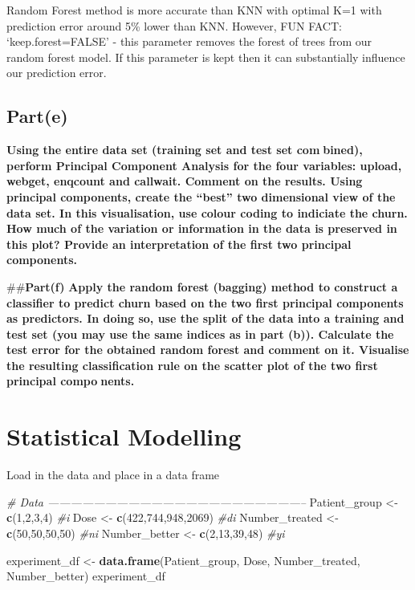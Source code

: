 \documentclass[
]{article}
\newenvironment{Shaded}{\begin{snugshade}}{\end{snugshade}}
\newcommand{\CommentTok}[1]{\textcolor[rgb]{0.56,0.35,0.01}{\textit{#1}}}
\newcommand{\DecValTok}[1]{\textcolor[rgb]{0.00,0.00,0.81}{#1}}
\newcommand{\KeywordTok}[1]{\textcolor[rgb]{0.13,0.29,0.53}{\textbf{#1}}}
\newcommand{\NormalTok}[1]{#1}
\newcommand{\StringTok}[1]{\textcolor[rgb]{0.31,0.60,0.02}{#1}}
\begin{document}
Random Forest method is more accurate than KNN with optimal K=1 with
prediction error around 5\% lower than KNN. However, FUN FACT:
`keep.forest=FALSE' - this parameter removes the forest of trees from
our random forest model. If this parameter is kept then it can
substantially influence our prediction error.

\hypertarget{parte}{%
\subsection{\texorpdfstring{\textbf{Part(e)}}{Part(e)}}\label{parte}}

\textbf{Using the entire data set (training set and test set combined),
perform Principal Component Analysis for the four variables: upload,
webget, enqcount and callwait. Comment on the results. Using principal
components, create the ``best'' two dimensional view of the data set. In
this visualisation, use colour coding to indiciate the churn. How much
of the variation or information in the data is preserved in this plot?
Provide an interpretation of the first two principal components.}

\#\#\textbf{Part(f)} \textbf{Apply the random forest (bagging) method to
construct a classifier to predict churn based on the two first principal
components as predictors. In doing so, use the split of the data into a
training and test set (you may use the same indices as in part (b)).
Calculate the test error for the obtained random forest and comment on
it. Visualise the resulting classification rule on the scatter plot of
the two first principal components.}

\hypertarget{statistical-modelling}{%
\section{Statistical Modelling}\label{statistical-modelling}}

Load in the data and place in a data frame

\begin{Shaded}
\begin{Highlighting}[]
\CommentTok{# Data --------------------------------------------------------------------}
\NormalTok{Patient_group <-}\StringTok{ }\KeywordTok{c}\NormalTok{(}\DecValTok{1}\NormalTok{,}\DecValTok{2}\NormalTok{,}\DecValTok{3}\NormalTok{,}\DecValTok{4}\NormalTok{) }\CommentTok{#i}
\NormalTok{Dose <-}\StringTok{ }\KeywordTok{c}\NormalTok{(}\DecValTok{422}\NormalTok{,}\DecValTok{744}\NormalTok{,}\DecValTok{948}\NormalTok{,}\DecValTok{2069}\NormalTok{) }\CommentTok{#di}
\NormalTok{Number_treated <-}\StringTok{ }\KeywordTok{c}\NormalTok{(}\DecValTok{50}\NormalTok{,}\DecValTok{50}\NormalTok{,}\DecValTok{50}\NormalTok{,}\DecValTok{50}\NormalTok{) }\CommentTok{#ni}
\NormalTok{Number_better <-}\StringTok{ }\KeywordTok{c}\NormalTok{(}\DecValTok{2}\NormalTok{,}\DecValTok{13}\NormalTok{,}\DecValTok{39}\NormalTok{,}\DecValTok{48}\NormalTok{) }\CommentTok{#yi}

\NormalTok{experiment_df <-}\StringTok{ }\KeywordTok{data.frame}\NormalTok{(Patient_group, Dose, Number_treated, Number_better)}
\NormalTok{experiment_df}
\end{Highlighting}
\end{Shaded}
\end{document}
